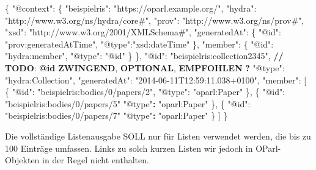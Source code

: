 \documentclass[,a4paper]{article}
\newenvironment{Shaded}{}{}
\newcommand{\DataTypeTok}[1]{\textcolor[rgb]{0.56,0.13,0.00}{{#1}}}
\newcommand{\StringTok}[1]{\textcolor[rgb]{0.25,0.44,0.63}{{#1}}}
\newcommand{\OtherTok}[1]{\textcolor[rgb]{0.00,0.44,0.13}{{#1}}}
\newcommand{\FunctionTok}[1]{\textcolor[rgb]{0.02,0.16,0.49}{{#1}}}
\newcommand{\ErrorTok}[1]{\textcolor[rgb]{1.00,0.00,0.00}{\textbf{{#1}}}}
\begin{document}
\begin{Shaded}
\begin{Highlighting}[]
\FunctionTok{\{}
    \DataTypeTok{"@context"}\FunctionTok{:} \FunctionTok{\{}
        \DataTypeTok{"beispielris"}\FunctionTok{:} \StringTok{"https://oparl.example.org/"}\FunctionTok{,}
        \DataTypeTok{"hydra"}\FunctionTok{:} \StringTok{"http://www.w3.org/ns/hydra/core#"}\FunctionTok{,}
        \DataTypeTok{"prov"}\FunctionTok{:} \StringTok{"http://www.w3.org/ns/prov#"}\FunctionTok{,}
        \DataTypeTok{"xsd"}\FunctionTok{:} \StringTok{"http://www.w3.org/2001/XMLSchema#"}\FunctionTok{,}
        \DataTypeTok{"generatedAt"}\FunctionTok{:} \FunctionTok{\{}
            \DataTypeTok{"@id"}\FunctionTok{:} \StringTok{"prov:generatedAtTime"}\FunctionTok{,}
            \DataTypeTok{"@type"}\FunctionTok{:}\StringTok{"xsd:dateTime"}
        \FunctionTok{\},}
        \DataTypeTok{"member"}\FunctionTok{:} \FunctionTok{\{}
            \DataTypeTok{"@id"}\FunctionTok{:} \StringTok{"hydra:member"}\FunctionTok{,}
            \DataTypeTok{"@type"}\FunctionTok{:} \StringTok{"@id"}
        \FunctionTok{\}}
    \FunctionTok{\},}
    \DataTypeTok{"@id"}\FunctionTok{:} \StringTok{"beispielris:collection2345"}\FunctionTok{,}
\ErrorTok{//} \ErrorTok{TODO}\FunctionTok{:} \ErrorTok{@id} \ErrorTok{ZWINGEND}\FunctionTok{,} \ErrorTok{OPTIONAL}\FunctionTok{,} \ErrorTok{EMPFOHLEN} \ErrorTok{?}
    \DataTypeTok{"@type"}\FunctionTok{:} \StringTok{"hydra:Collection"}\FunctionTok{,}
    \DataTypeTok{"generatedAt"}\FunctionTok{:} \StringTok{"2014-06-11T12:59:11.038+0100"}\FunctionTok{,}
    \DataTypeTok{"member"}\FunctionTok{:} \OtherTok{[}
        \FunctionTok{\{}
            \DataTypeTok{"@id"}\FunctionTok{:} \StringTok{"beispielris:bodies/0/papers/2"}\FunctionTok{,}
            \DataTypeTok{"@type"}\FunctionTok{:} \StringTok{"oparl:Paper"}
        \FunctionTok{\}}\OtherTok{,}
        \FunctionTok{\{}
            \DataTypeTok{"@id"}\FunctionTok{:} \StringTok{"beispielris:bodies/0/papers/5"}
            \StringTok{"@type"}\ErrorTok{:} \StringTok{"oparl:Paper"}
        \FunctionTok{\}}\OtherTok{,}
        \FunctionTok{\{}
            \DataTypeTok{"@id"}\FunctionTok{:} \StringTok{"beispielris:bodies/0/papers/7"}
            \StringTok{"@type"}\ErrorTok{:} \StringTok{"oparl:Paper"}
        \FunctionTok{\}}
    \OtherTok{]}
\FunctionTok{\}}
\end{Highlighting}
\end{Shaded}

Die vollständige Listenausgabe SOLL nur für Listen verwendet werden, die
bis zu 100 Einträge umfassen. Links zu solch kurzen Listen wir jedoch in
OParl-Objekten in der Regel nicht enthalten.
\end{document}
